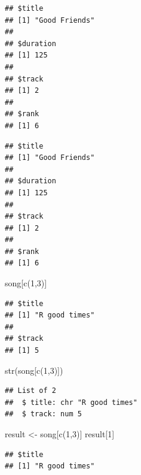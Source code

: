 \documentclass[
]{book}
\newenvironment{Shaded}{\begin{snugshade}}{\end{snugshade}}
\newcommand{\DecValTok}[1]{\textcolor[rgb]{0.00,0.00,0.81}{#1}}
\newcommand{\FunctionTok}[1]{\textcolor[rgb]{0.00,0.00,0.00}{#1}}
\newcommand{\NormalTok}[1]{#1}
\newcommand{\OtherTok}[1]{\textcolor[rgb]{0.56,0.35,0.01}{#1}}
\newcommand{\SpecialCharTok}[1]{\textcolor[rgb]{0.00,0.00,0.00}{#1}}
\begin{document}
\begin{verbatim}
## $title
## [1] "Good Friends"
## 
## $duration
## [1] 125
## 
## $track
## [1] 2
## 
## $rank
## [1] 6
\end{verbatim}

\begin{Shaded}
\end{Shaded}

\begin{verbatim}
## $title
## [1] "Good Friends"
## 
## $duration
## [1] 125
## 
## $track
## [1] 2
## 
## $rank
## [1] 6
\end{verbatim}

\begin{Shaded}
\begin{Highlighting}[]
\NormalTok{song[}\FunctionTok{c}\NormalTok{(}\DecValTok{1}\NormalTok{,}\DecValTok{3}\NormalTok{)]}
\end{Highlighting}
\end{Shaded}

\begin{verbatim}
## $title
## [1] "R good times"
## 
## $track
## [1] 5
\end{verbatim}

\begin{Shaded}
\begin{Highlighting}[]
\FunctionTok{str}\NormalTok{(song[}\FunctionTok{c}\NormalTok{(}\DecValTok{1}\NormalTok{,}\DecValTok{3}\NormalTok{)])}
\end{Highlighting}
\end{Shaded}

\begin{verbatim}
## List of 2
##  $ title: chr "R good times"
##  $ track: num 5
\end{verbatim}

\begin{Shaded}
\begin{Highlighting}[]
\NormalTok{result }\OtherTok{\textless{}{-}}\NormalTok{ song[}\FunctionTok{c}\NormalTok{(}\DecValTok{1}\NormalTok{,}\DecValTok{3}\NormalTok{)]}
\NormalTok{result[}\DecValTok{1}\NormalTok{]}
\end{Highlighting}
\end{Shaded}

\begin{verbatim}
## $title
## [1] "R good times"
\end{verbatim}
\end{document}
